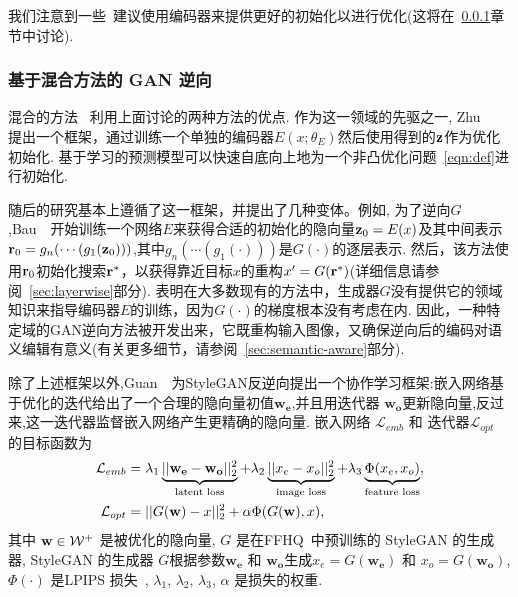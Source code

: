 我们注意到一些~\cite{zhu2016generative,bau2019inverting,guan2020faster}建议使用编码器来提供更好的初始化以进行优化(这将在~\ref{sec:hybrid}章节中讨论).

\subsubsection{基于混合方法的 GAN 逆向}
\label{sec:hybrid}

混合的方法~\cite{zhu2016generative,bau2019seeing,bau2019inverting,zhu2020indomain,guan2020faster} 利用上面讨论的两种方法的优点. 
作为这一领域的先驱之一, Zhu~\etal~\cite{zhu2016generative} 提出一个框架，通过训练一个单独的编码器$E(x; \theta_E)$然后使用得到的$\mathbf{z}$作为优化初始化.
基于学习的预测模型可以快速自底向上地为一个非凸优化问题~\eqref{eqn:def}进行初始化.

随后的研究基本上遵循了这一框架，并提出了几种变体。例如, 为了逆向$G$,Bau~\etal~\cite{bau2019inverting}开始训练一个网络$E$来获得合适的初始化的隐向量$\mathbf{z}_{0}=E(x)$及其中间表示$\mathbf{r}_{0}=g_{n}(\cdots(g_{1}(\mathbf{z}_{0})))$,其中$g_{n}(\cdots(g_{1}(\cdot)))$是$G(\cdot)$的逐层表示.
然后，该方法使用$\mathbf{r}_{0}$初始化搜索$\mathbf{r}^{*}$，以获得靠近目标$x$的重构$x^{\prime}=G(\mathbf{r}^{*})$(详细信息请参阅~\ref{sec:layerwise}部分).
表明在大多数现有的方法中，生成器$G$没有提供它的领域知识来指导编码器$E$的训练，因为$G(\cdot)$的梯度根本没有考虑在内. 
因此，一种特定域的GAN逆向方法被开发出来，它既重构输入图像，又确保逆向后的编码对语义编辑有意义(有关更多细节，请参阅~\ref{sec:semantic-aware}部分).

除了上述框架以外,Guan~\etal~\cite{guan2020faster}为StyleGAN反逆向提出一个协作学习框架:嵌入网络基于优化的迭代给出了一个合理的隐向量初值$\mathbf{w_e}$,并且用迭代器 $\mathbf{w_o}$更新隐向量,反过来,这一迭代器监督嵌入网络产生更精确的隐向量. 嵌入网络 $\mathcal{L}_{emb}$ 和 迭代器$\mathcal{L}_{opt}$ 的目标函数为
\begin{equation}
\begin{aligned}
\mathcal{L}_{emb} & = \lambda_1 \underbrace{||\mathbf{w_e} - \mathbf{w_o}||_2^2}_{\text{latent loss}} + \lambda_2 \underbrace{||{x_e} - {x_o}||_2^2}_{\text{image loss}} + \lambda_3 \underbrace{\Phi({x_e}, {x_o})}_{\text{feature loss}}, \\
\mathcal{L}_{opt} & = ||G(\mathbf{w}) - {x}||_2^2 + \alpha \Phi(G(\mathbf{w}), x),\\
\end{aligned}
\end{equation}
其中 $\mathbf{w} \in \mathcal{W^+}$ 是被优化的隐向量, $G$ 是在FFHQ~\cite{karras2019style}中预训练的 StyleGAN 的生成器,  StyleGAN 的生成器 $G$根据参数$\mathbf{w_e}$ 和 $\mathbf{w_o}$生成${x_e} = G(\mathbf{w_e})$ 和 ${x_o} = G(\mathbf{w_o})$, $\Phi(\cdot)$ 是LPIPS 损失~\cite{zhang2018unreasonable},  $\lambda_1$, $\lambda_2$, $\lambda_3$, $\alpha$ 是损失的权重.




